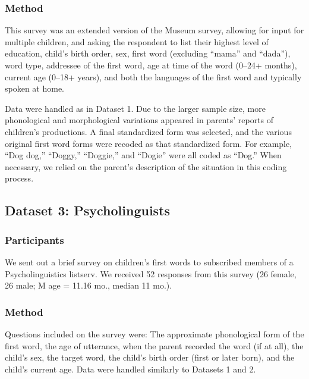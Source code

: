 \documentclass[10pt,letterpaper]{article}
\begin{document}
\subsubsection{Method}

This survey was an extended version of the Museum survey, allowing for input for multiple children, and asking the respondent to list their highest level of education, child's birth order, sex, first word (excluding ``mama'' and ``dada''), word type, addressee of the first word, age at time of the word (0--24+ months), current age (0--18+ years), and both the languages of the first word and typically spoken at home.

Data were handled as in Dataset 1. Due to the larger sample size, more phonological and morphological variations appeared in parents' reports of children's productions. A final standardized form was selected, and the various original first word forms were recoded as that standardized form. For example, ``Dog dog,'' ``Doggy,'' ``Doggie,'' and ``Dogie'' were all coded as ``Dog.'' When necessary, we relied on the parent's description of the situation in this coding process.

\vspace{-.2em}
\subsection{Dataset 3: Psycholinguists }

\subsubsection{Participants}

We sent out a brief survey on children's first words to subscribed members of a Psycholinguistics listserv. We received 52 responses from this survey (26 female, 26 male; M age = 11.16 mo., median 11 mo.).

\subsubsection{Method}

Questions included on the survey were: The approximate phonological form of the first word, the age of utterance, when the parent recorded the word (if at all), the child's sex, the target word, the child's birth order (first or later born), and the child's current age. Data were handled similarly to Datasets 1 and 2. 

\vspace{-.2em}
\end{document}
